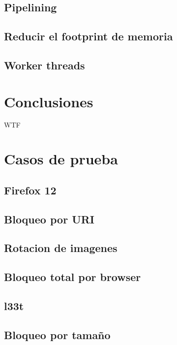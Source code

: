 \documentclass[11pt,a4paper,titlepage]{article}
\begin{document}
    \subsection{Pipelining}

    \subsection{Reducir el footprint de memoria}

    \subsection{Worker threads}

\section{Conclusiones}
    WTF

\section{Casos de prueba}
    \subsection{Firefox 12}

    \subsection{Bloqueo por URI}

    \subsection{Rotacion de imagenes}

    \subsection{Bloqueo total por browser}

    \subsection{l33t}

    \subsection{Bloqueo por tamaño}

\end{document}
